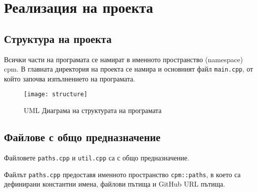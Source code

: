 \graphicspath{ {./chapter3/images/} }

\chapter{Реализация на проекта}


\section{Структура на проекта}

Всички части на програмата се намират в именното пространство (namespace) cpm.
В главната директория на проекта се намира и основният файл \texttt{main.cpp},
от който започва изпълнението на програмата.

\begin{figure}[h]
    \centering
    \texttt{[image: structure]}
    \caption{UML Диаграма на структурата на програмата}
    \label{fig:structure}
\end{figure}


\section{Файлове с общо предназначение}

Файловете \texttt{paths.cpp} и \texttt{util.cpp} са с общо предназначение.

Файлът \texttt{paths.cpp} предоставя именното пространство \texttt{cpm::paths}, в
което са дефинирани константни имена, файлови пътища и GitHub URL пътища.









